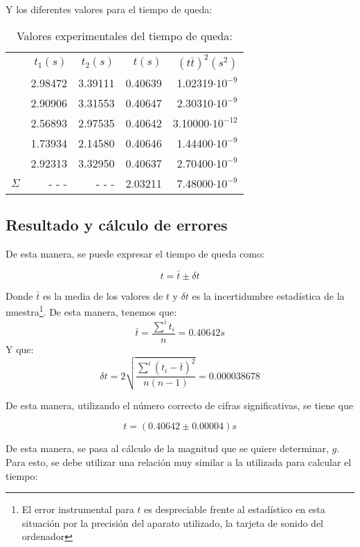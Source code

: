 \documentclass[a4paper,12pt]{article}
\begin{document}
Y los diferentes valores para el tiempo de queda:
\begin{table}[h!]
  \centering
  \caption{Valores experimentales del tiempo de queda:}
  \begin{tabular}{|l|r|r|r|r|}
    \hline
    &$t_{1}(s)$ & $t_{2}(s)$ &$t(s)$&$(t\bar{t})^2(s^2)$  \\
    \cline{2-5}
    & 2.98472& 3.39111& 0.40639& 1.02319$\cdot 10^{-9}$ \\
    \cline{2-5}
    &2.90906& 3.31553& 0.40647& 2.30310$\cdot 10^{-9}$ \\
    \cline{2-5}
    &2.56893& 2.97535& 0.40642& 3.10000$\cdot 10^{-12}$ \\
    \cline{2-5}
    &1.73934& 2.14580& 0.40646& 1.44400$\cdot 10^{-9}$\\
    \cline{2-5}
    &2.92313& 3.32950& 0.40637& 2.70400$\cdot 10^{-9} $\\
    \hline
    $\Sigma$& - - - & - - -&2.03211& 7.48000$\cdot 10^{-9}$ \\
    \hline
  \end{tabular}
\end{table}

\subsection{Resultado y cálculo de errores}
De esta manera, se puede expresar el tiempo de queda como:

$$t= \bar{t} \pm\delta t$$

Donde $\bar{t}$ es la media de los valores de $t$ y $\delta t$ es la incertidumbre estadística
de la muestra\footnote{El error instrumental para $t$ es despreciable frente al estadístico en esta situación por la precisión del aparato utilizado, la tarjeta de sonido del ordenador}.
De esta manera, tenemos que:
$$\bar{t} =\frac{ \sum^i t_{i}}{n} = 0.40642 s$$
Y que:
$$\delta t = 2 \sqrt{\frac{\sum^i (t_{i}-\bar{t})^2}{n(n-1)}}= 0.000038678$$ 

De esta manera, utilizando el número correcto de cifras significativas, se tiene que

\begin{tcolorbox}
  \begin{equation}
    t = (0.40642 \pm 0.00004) s 
  \end{equation}
\end{tcolorbox}

De esta manera, se pasa al cálculo de la magnitud que se quiere determinar, $g$. Para esto,
se debe utilizar una relación muy similar a la utilizada para calcular el tiempo:
\end{document}
